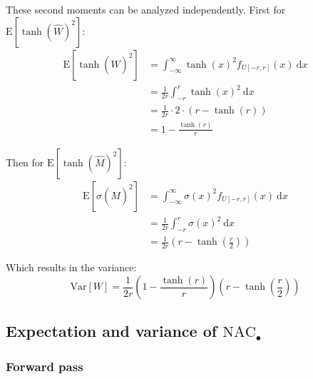 These second moments can be analyzed independently. First for $\mathrm{E}[\tanh(\hat{W})^2]$:
\begin{equation}
\begin{aligned}
\mathrm{E}[\tanh(\hat{W})^2] &= \int_{-\infty}^{\infty} \tanh(x)^2 f_{U[-r, r]}(x)\ \mathrm{d}x \\
&= \frac{1}{2r} \int_{-r}^{r} \tanh(x)^2\ \mathrm{d}x \\
&= \frac{1}{2r} \cdot 2 \cdot (r - \tanh(r)) \\
&= 1 - \frac{\tanh(r)}{r}
\end{aligned}
\end{equation}

Then for $\mathrm{E}[\tanh(\hat{M})^2]$:
\begin{equation}
\begin{aligned}
\mathrm{E}[\sigma(\hat{M})^2] &= \int_{-\infty}^{\infty} \sigma(x)^2 f_{U[-r, r]}(x)\ \mathrm{d}x \\
&= \frac{1}{2r} \int_{-r}^{r} \sigma(x)^2\ \mathrm{d}x \\
&= \frac{1}{2r} \left(r - \tanh\left(\frac{r}{2}\right)\right)
\end{aligned}
\end{equation}

Which results in the variance:
\begin{equation}
\mathrm{Var}[W] = \frac{1}{2r} \left(1 - \frac{\tanh(r)}{r}\right) \left(r - \tanh\left(\frac{r}{2}\right)\right)
\end{equation}

\subsection{Expectation and variance of \texorpdfstring{$\mathrm{NAC}_{\bullet}$}{NAC-mul}}
\label{sec:appendix:moments:nac-mul}
\subsubsection{Forward pass}

